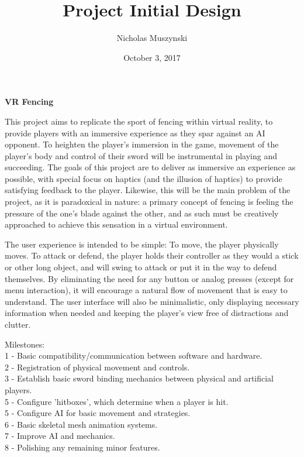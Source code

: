 \documentclass{article}
\begin{document}
\title{Project Initial Design}
\author{Nicholas Muszynski}
\date{October 3, 2017}

\maketitle

\textbf{VR Fencing}
\newline

This project aims to replicate the sport of fencing within virtual reality, to provide players with an immersive experience as they spar against an AI opponent. To heighten the player's immersion in the game, movement of the player's body and control of their sword will be instrumental in playing and succeeding. The goals of this project are to deliver as immersive an experience as possible, with special focus on haptics (and the illusion of haptics) to provide satisfying feedback to the player. Likewise, this will be the main problem of the project, as it is paradoxical in nature: a primary concept of fencing is feeling the pressure of the one's blade against the other, and as such must be creatively approached to achieve this sensation in a virtual environment.\\

\newline

The user experience is intended to be simple: To move, the player physically moves. To attack or defend, the player holds their controller as they would a stick or other long object, and will swing to attack or put it in the way to defend themselves. By eliminating the need for any button or analog presses (except for menu interaction), it will encourage a natural flow of movement that is easy to understand. The user interface will also be minimalistic, only displaying necessary information when needed and keeping the player's view free of distractions and clutter.\\

\newline

Milestones:\\
1 - Basic compatibility/communication between software and hardware.\\
2 - Registration of physical movement and controls.\\
3 - Establish basic sword binding mechanics between physical and artificial players.\\
5 - Configure 'hitboxes', which determine when a player is hit.\\
5 - Configure AI for basic movement and strategies.\\
6 - Basic skeletal mesh animation systems.\\
7 - Improve AI and mechanics.\\
8 - Polishing any remaining minor features.\\
\end{document}
